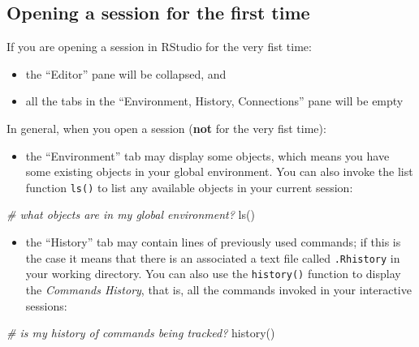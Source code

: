\documentclass[
]{book}
\newenvironment{Shaded}{\begin{snugshade}}{\end{snugshade}}
\newcommand{\CommentTok}[1]{\textcolor[rgb]{0.56,0.35,0.01}{\textit{#1}}}
\newcommand{\FunctionTok}[1]{\textcolor[rgb]{0.00,0.00,0.00}{#1}}
\newcommand{\NormalTok}[1]{#1}
\providecommand{\tightlist}{%
  \setlength{\itemsep}{0pt}\setlength{\parskip}{0pt}}
\begin{document}
\hypertarget{opening-a-session-for-the-first-time}{%
\subsection{Opening a session for the first time}\label{opening-a-session-for-the-first-time}}

If you are opening a session in RStudio for the very fist time:

\begin{itemize}
\item
  the ``Editor'' pane will be collapsed, and
\item
  all the tabs in the ``Environment, History, Connections'' pane will be empty
\end{itemize}

In general, when you open a session (\textbf{not} for the very fist time):

\begin{itemize}
\tightlist
\item
  the ``Environment'' tab may display some objects, which means you have some
  existing objects in your global environment. You can also invoke the list
  function \texttt{ls()} to list any available objects in your current session:
\end{itemize}

\begin{Shaded}
\begin{Highlighting}[]
\CommentTok{\# what objects are in my global environment?}
\FunctionTok{ls}\NormalTok{()}
\end{Highlighting}
\end{Shaded}

\begin{itemize}
\tightlist
\item
  the ``History'' tab may contain lines of previously used commands; if this is
  the case it means that there is an associated a text file called \texttt{.Rhistory} in
  your working directory. You can also use the \texttt{history()} function to display
  the \emph{Commands History}, that is, all the commands invoked in your interactive
  sessions:
\end{itemize}

\begin{Shaded}
\begin{Highlighting}[]
\CommentTok{\# is my history of commands being tracked?}
\FunctionTok{history}\NormalTok{()}
\end{Highlighting}
\end{Shaded}
\end{document}
